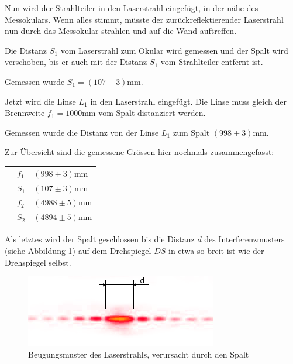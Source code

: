 Nun  wird  der  Strahlteiler  in  den Laserstrahl eingef\"ugt, in der n\"ahe des
Messokulars. Wenn alles stimmt, m\"usste der zur\"uckreflektierender Laserstrahl
nun   durch   das   Messokular   strahlen   und   auf   die   Wand   auftreffen.

Die  Distanz  $S_1$  vom Laserstrahl zum Okular wird gemessen und der Spalt wird
verschoben,  bis  er  auch  mit der Distanz $S_1$ vom Strahlteiler entfernt ist.

Gemessen wurde $S_1 = (107\pm3)\textrm{mm}$.

Jetzt wird die Linse $L_1$ in den Laserstrahl eingef\"ugt. Die Linse muss gleich
der   Brennweite   $f_1   =   1000\textrm{mm}$  vom  Spalt  distanziert  werden.

Gemessen wurde die Distanz von der Linse $L_1$ zum Spalt $(998\pm3)\textrm{mm}$.

Zur \"Ubersicht sind die gemessene Gr\"ossen hier nochmals zusammengefasst:

\begin{tabular}{lp{25mm}l}
    \hspace{4mm}
    & $f_1$ & $(998\pm3)\textrm{mm}$ \\
    & $S_1$ & $(107\pm3)\textrm{mm}$ \\
    & $f_2$ & $(4988\pm5)\textrm{mm}$ \\
    & $S_2$ & $(4894\pm5)\textrm{mm}$ \\
\end{tabular}

Als   letztes   wird   der   Spalt   geschlossen   bis   die   Distanz  $d$  des
Interferenzmusters  (siehe  Abbildung \ref{fig:diffraction}) auf dem Drehspiegel
$DS$    in    etwa    so    breit    ist    wie    der    Drehspiegel    selbst.

\begin{figure}[H]
    \center
    \includegraphics[width=.9\textwidth]{images/diffraction.png}
    \caption{Beugungsmuster des Laserstrahls, verursacht durch den Spalt}
    \label{fig:diffraction}
\end{figure}

